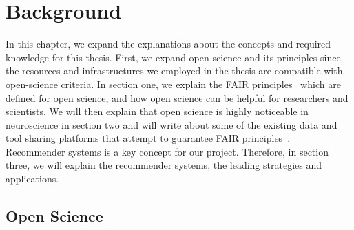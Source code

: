 \chapter{Background}
\label{background}

\cite{abrams2021standards} 

In this chapter, we expand the explanations about the concepts and required knowledge for this thesis. First, we expand open-science and its principles since the resources and infrastructures we employed in the thesis are compatible with open-science criteria. In section one, we explain the FAIR principles~\cite{FAIR_Principles} which are defined for open science, and how open science can be helpful for researchers and scientists.
We will then explain that open science is highly noticeable in neuroscience in section two and will write about some of the existing data and tool sharing platforms that attempt to guarantee FAIR principles~\cite{wilkinson2016fair}. Recommender systems is a key concept for our project. Therefore, in section three, we will explain the recommender systems, the leading strategies and applications.





\section{Open Science}

